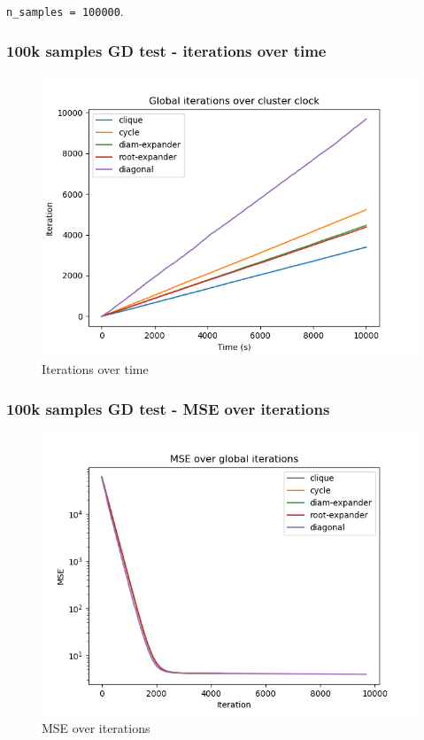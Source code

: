 \documentclass[11pt]{article}
\makeatletter
\def\maxwidth{\ifdim\Gin@nat@width>\linewidth\linewidth
    \else\Gin@nat@width\fi}
\let\Oldincludegraphics\includegraphics
\renewcommand{\includegraphics}[1]{\Oldincludegraphics[width=.8\maxwidth]{#1}}
\makeatother
\begin{document}
\texttt{n\_samples\ =\ 100000}.

    \subsubsection{100k samples GD test - iterations over
time}\label{k-samples-gd-test---iterations-over-time}

\begin{figure}
\centering
\includegraphics{media/img/tests/test_003_100ksamples_classic/1_iter_time.png}
\caption{Iterations over time}
\end{figure}

    \subsubsection{100k samples GD test - MSE over
iterations}\label{k-samples-gd-test---mse-over-iterations}

\begin{figure}
\centering
\includegraphics{media/img/tests/test_003_100ksamples_classic/2_mse_iter.png}
\caption{MSE over iterations}
\end{figure}
\end{document}
